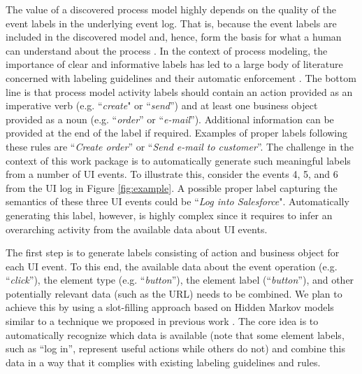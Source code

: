 The value of a discovered process model highly depends on the quality of the event labels in the underlying event log. That is, because the event labels are included in the discovered model and, hence, form the basis for what a human can understand about the process \cite{mendling2010activity,Leopold2013Book}. In the context of process modeling, the importance of clear and informative labels has led to a large body of literature concerned with labeling guidelines \cite{mendling2010seven,leopold2015learning} and their automatic enforcement \cite{leopold2013detection,becker2009towards}. The bottom line is that process model activity labels should contain an action provided as an imperative verb (e.g. ``\textit{create}" or ``\textit{send}'') and at least one business object provided as a noun (e.g. ``\textit{order}'' or ``\textit{e-mail}''). Additional information can be provided at the end of the label if required. Examples of proper labels following these rules are ``\textit{Create order}'' or ``\textit{Send e-mail to customer}''. The challenge in the context of this work package is to automatically generate such meaningful labels from a number of UI events. To illustrate this, consider the events 4, 5, and 6 from the UI log in Figure \ref{fig:example}. A possible proper label capturing the semantics of these three UI events could be ``\textit{Log into Salesforce}". Automatically generating this label, however, is highly complex since it requires to infer an overarching activity from the available data about UI events.

 The first step is to generate labels consisting of action and business object for each UI event. To this end, the available data about the event operation (e.g. ``\textit{click}''), the element type (e.g. ``\textit{button}''), the element label (``\textit{button}''), and other potentially relevant data (such as the URL) needs to be combined. We plan to achieve this by using a slot-filling approach based on Hidden Markov models similar to a technique we proposed in previous work \cite{van2017transforming}. The core idea is to automatically recognize which data is available (note that some element labels, such as ``log in'', represent useful actions while others do not) and combine this data in a way that it complies with existing labeling guidelines and rules.   

